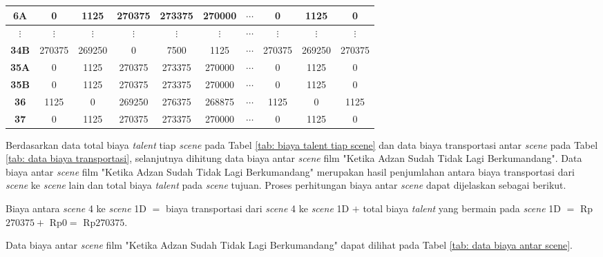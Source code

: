 {{{\begin{tabularx}{\textwidth}{|c|c|c|c|c|c|c|c|c|c|}
    \textbf{6A}             & 0          & 1125        & 270375      & 273375      & 270000      & $\cdots$          & 0            & 1125        & 0           \\ \hline
    \textbf{$\vdots$}       & $\vdots$   & $\vdots$    & $\vdots$    & $\vdots$    & $\vdots$    & $\cdots$          & $\vdots$     & $\vdots$    & $\vdots$    \\ \hline
    \textbf{34B}            & 270375     & 269250      & 0           & 7500        & 1125        & $\cdots$          & 270375       & 269250      & 270375      \\ \hline
    \textbf{35A}            & 0          & 1125        & 270375      & 273375      & 270000      & $\cdots$          & 0            & 1125        & 0           \\ \hline
    \textbf{35B}            & 0          & 1125        & 270375      & 273375      & 270000      & $\cdots$          & 0            & 1125        & 0           \\ \hline
    \textbf{36}             & 1125       & 0           & 269250      & 276375      & 268875      & $\cdots$          & 1125         & 0           & 1125        \\ \hline
    \textbf{37}             & 0          & 1125        & 270375      & 273375      & 270000      & $\cdots$          & 0            & 1125        & 0           \\ \hline
\end{tabularx}
}

Berdasarkan data total biaya \textit{talent} tiap \textit{scene} pada Tabel \ref{tab: biaya talent tiap scene} dan data biaya transportasi antar \textit{scene} pada Tabel \ref{tab: data biaya transportasi},
selanjutnya dihitung data biaya antar \textit{scene} film "Ketika Adzan Sudah Tidak Lagi Berkumandang".
Data biaya antar \textit{scene} film "Ketika Adzan Sudah Tidak Lagi Berkumandang" merupakan hasil penjumlahan antara biaya transportasi dari \textit{scene} ke \textit{scene} lain dan total biaya \textit{talent} pada \textit{scene} tujuan.
Proses perhitungan biaya antar \textit{scene} dapat dijelaskan sebagai berikut.

\noindent
Biaya antara \textit{scene} 4 ke \textit{scene} 1D $=$ biaya transportasi dari \textit{scene} 4 ke \textit{scene} 1D $ + $ total biaya \textit{talent} yang bermain pada \textit{scene} 1D $ = $ Rp$270375 + $ Rp$0 = $ Rp$270375$.

\noindent
Data biaya antar \textit{scene} film "Ketika Adzan Sudah Tidak Lagi Berkumandang" dapat dilihat pada Tabel \ref{tab: data biaya antar scene}.

}}
